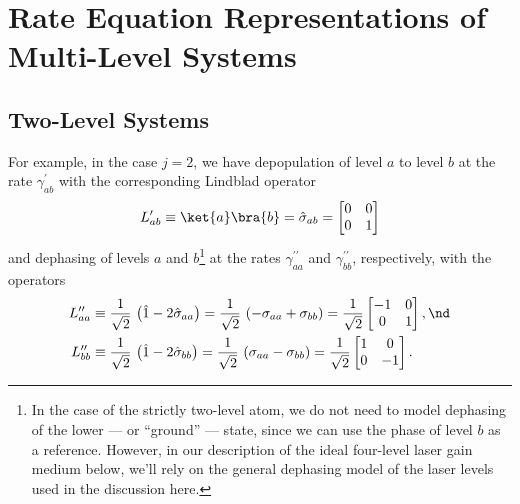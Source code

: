 %
%
%
%

 \section{Rate Equation Representations of Multi-Level Systems\label{sct:laser_gain_med_rate_eqn}}

 \subsection{Two-Level Systems\label{sct:laser_gain_med_tls}}
For example, in the case $j = 2$, we have depopulation of level $a$ to level $b$ at the rate $\gamma^\prime_{a b}$ with the corresponding Lindblad operator
 \begin{equation}
 L^\prime_{a b} \equiv \ket{a} \bra{b} = \hat{\sigma}_{a b} = \begin{bmatrix}
 0 & 0 \\
 0 & 1
 \end{bmatrix}
 \end{equation}
and dephasing of levels $a$ and $b$\footnote{In the case of the strictly two-level atom, we do not need to model dephasing of the lower --- or ``ground'' --- state, since we can use the phase of level $b$ as a reference. However, in our description of the ideal four-level laser gain medium below, we'll rely on the general dephasing model of the laser levels used in the discussion here.} at the rates $\gamma^{\prime \prime}_{a a}$ and $\gamma^{\prime \prime}_{b b}$, respectively, with the operators
 \begin{subequations}
 \begin{align}
L^{\prime \prime}_{a a} &\equiv \frac{1}{\sqrt{2}}\, \left(\hat{1} - 2 \hat{\sigma}_{a a}\right) = \frac{1}{\sqrt{2}}\, \left(-\sigma_{a a} + \sigma_{b b}\right) = \frac{1}{\sqrt{2}}
\begin{bmatrix}
 -1 & 0 \\
 0 & 1
 \end{bmatrix} , \nd \\
L^{\prime \prime}_{b b} &\equiv \frac{1}{\sqrt{2}}\, \left(\hat{1} - 2 \hat{\sigma}_{b b}\right) = \frac{1}{\sqrt{2}}\, \left(\sigma_{a a} - \sigma_{b b}\right) = \frac{1}{\sqrt{2}}
\begin{bmatrix}
 1 & 0 \\
 0 & -1
 \end{bmatrix} .
 \end{align}
 \end{subequations}

